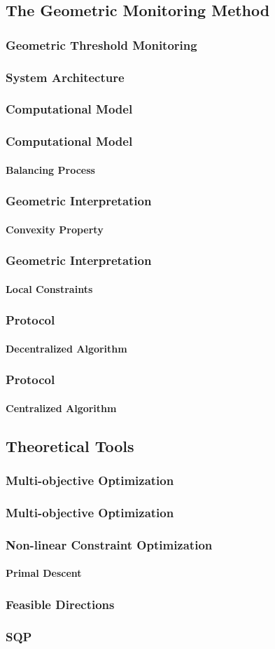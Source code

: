 \documentclass[hyperref={pdfpagelabels=false}]{beamer}
\begin{document}
\subsection{The Geometric Monitoring Method}
\begin{frame} \frametitle{Geometric Threshold Monitoring}

\end{frame}
\begin{frame} \frametitle{System Architecture}

\end{frame}
\begin{frame} \frametitle{Computational Model}

\end{frame}
\begin{frame} \frametitle{Computational Model}\framesubtitle{Balancing Process}

\end{frame}
\begin{frame} \frametitle{Geometric Interpretation}\framesubtitle{Convexity Property}

\end{frame}
\begin{frame} \frametitle{Geometric Interpretation}\framesubtitle{Local Constraints}

\end{frame}
\begin{frame} \frametitle{Protocol}\framesubtitle{Decentralized Algorithm}

\end{frame}
\begin{frame} \frametitle{Protocol}\framesubtitle{Centralized Algorithm}

\end{frame}
\subsection{Theoretical Tools}
\subsubsection*{Multi-objective Optimization}
\begin{frame} \frametitle{Multi-objective Optimization}

\end{frame}
\begin{frame} \frametitle{Non-linear Constraint Optimization}\framesubtitle{Primal Descent}

\end{frame}
\begin{frame} \frametitle{Feasible Directions}

\end{frame}
\begin{frame} \frametitle{SQP}

\end{frame}
\end{document}
